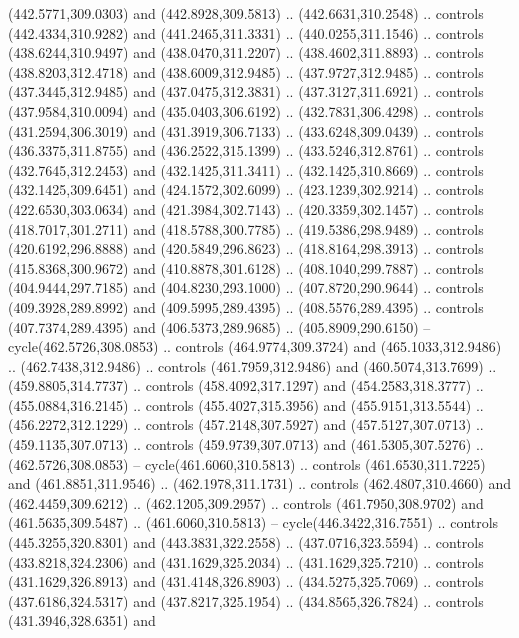 \begin{scope}[cm={{1.25,0.0,0.0,-1.25,(0.0,743.43331)}}]
    (442.5771,309.0303) and (442.8928,309.5813) .. (442.6631,310.2548) .. controls
    (442.4334,310.9282) and (441.2465,311.3331) .. (440.0255,311.1546) .. controls
    (438.6244,310.9497) and (438.0470,311.2207) .. (438.4602,311.8893) .. controls
    (438.8203,312.4718) and (438.6009,312.9485) .. (437.9727,312.9485) .. controls
    (437.3445,312.9485) and (437.0475,312.3831) .. (437.3127,311.6921) .. controls
    (437.9584,310.0094) and (435.0403,306.6192) .. (432.7831,306.4298) .. controls
    (431.2594,306.3019) and (431.3919,306.7133) .. (433.6248,309.0439) .. controls
    (436.3375,311.8755) and (436.2522,315.1399) .. (433.5246,312.8761) .. controls
    (432.7645,312.2453) and (432.1425,311.3411) .. (432.1425,310.8669) .. controls
    (432.1425,309.6451) and (424.1572,302.6099) .. (423.1239,302.9214) .. controls
    (422.6530,303.0634) and (421.3984,302.7143) .. (420.3359,302.1457) .. controls
    (418.7017,301.2711) and (418.5788,300.7785) .. (419.5386,298.9489) .. controls
    (420.6192,296.8888) and (420.5849,296.8623) .. (418.8164,298.3913) .. controls
    (415.8368,300.9672) and (410.8878,301.6128) .. (408.1040,299.7887) .. controls
    (404.9444,297.7185) and (404.8230,293.1000) .. (407.8720,290.9644) .. controls
    (409.3928,289.8992) and (409.5995,289.4395) .. (408.5576,289.4395) .. controls
    (407.7374,289.4395) and (406.5373,289.9685) .. (405.8909,290.6150) --
    cycle(462.5726,308.0853) .. controls (464.9774,309.3724) and
    (465.1033,312.9486) .. (462.7438,312.9486) .. controls (461.7959,312.9486) and
    (460.5074,313.7699) .. (459.8805,314.7737) .. controls (458.4092,317.1297) and
    (454.2583,318.3777) .. (455.0884,316.2145) .. controls (455.4027,315.3956) and
    (455.9151,313.5544) .. (456.2272,312.1229) .. controls (457.2148,307.5927) and
    (457.5127,307.0713) .. (459.1135,307.0713) .. controls (459.9739,307.0713) and
    (461.5305,307.5276) .. (462.5726,308.0853) -- cycle(461.6060,310.5813) ..
    controls (461.6530,311.7225) and (461.8851,311.9546) .. (462.1978,311.1731) ..
    controls (462.4807,310.4660) and (462.4459,309.6212) .. (462.1205,309.2957) ..
    controls (461.7950,308.9702) and (461.5635,309.5487) .. (461.6060,310.5813) --
    cycle(446.3422,316.7551) .. controls (445.3255,320.8301) and
    (443.3831,322.2558) .. (437.0716,323.5594) .. controls (433.8218,324.2306) and
    (431.1629,325.2034) .. (431.1629,325.7210) .. controls (431.1629,326.8913) and
    (431.4148,326.8903) .. (434.5275,325.7069) .. controls (437.6186,324.5317) and
    (437.8217,325.1954) .. (434.8565,326.7824) .. controls (431.3946,328.6351) and

\end{scope}

